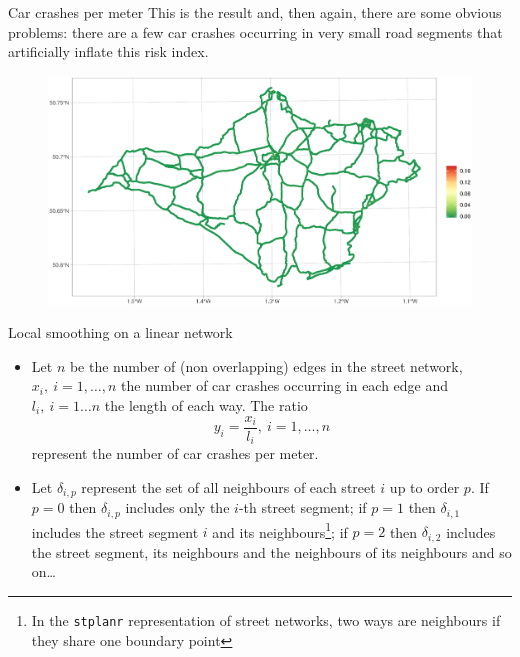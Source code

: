 \documentclass[c,10pt,pdftex]{beamer}
\begin{document}
\begin{frame}{Car crashes per meter}
\vspace{-0.25cm}
This is the result and, then again, there are some obvious problems: there are a few car crashes occurring in very small road segments that artificially inflate this risk index.  
\begin{figure}
	\centering
	\includegraphics[width=\linewidth]{images/car_crashes_per_meter}
\end{figure}
\end{frame}

\begin{frame}{Local smoothing on a linear network}
\vspace{-0.75cm}
\begin{itemize}
	\setlength\itemsep{1em}
	\item Let $n$ be the number of (non overlapping) edges in the street network, $x_i, \ i = 1,\dots,n$ the number of car crashes occurring in each edge and $l_i, \ i = 1\dots n$ the length of each way. The ratio 
	\[
	y_i = \frac{x_i}{l_i}, \ i = 1, \dots, n
	\] 
	represent the number of car crashes per meter. 
	
	\item Let $\delta_{i, p}$ represent the set of all neighbours of each street $i$ up to order $p$. If $p = 0$ then $\delta_{i, p}$ includes only the $i$-th street segment; if $p = 1$ then $\delta_{i, 1}$ includes the street segment $i$ and its neighbours\footnote{In the \texttt{stplanr} representation of street networks, two ways are neighbours if they share one boundary point}; if $p = 2$ then $\delta_{i,2}$ includes the street segment, its neighbours and the neighbours of its neighbours and so on\dots
\end{itemize}
\end{frame}
\end{document}
